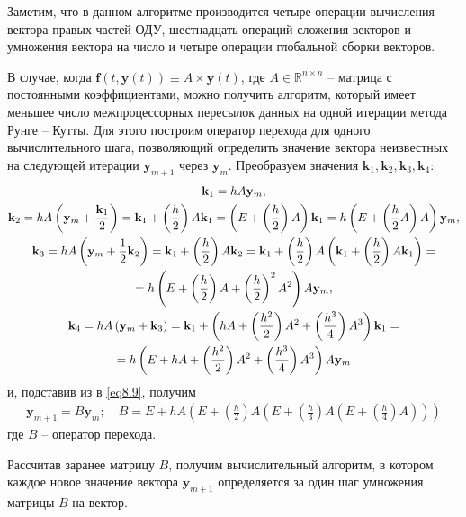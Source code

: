 \documentclass[14pt,final,titlepage,pscyr]{hedwork}
\renewcommand{\vec}[1]{\mathbf{#1}}
\begin{document}
	Заметим, что в данном алгоритме производится четыре операции вычисления вектора правых частей ОДУ, 
	шестнадцать операций сложения векторов и умножения вектора на число и четыре операции глобальной 
	сборки векторов. 

	В случае, когда \( \vec{f}(t, \vec{y}(t)) \equiv A \times \vec{y}(t) \), где 
	\( A \in \mathbb{R}^{n\times n} \) -- матрица с постоянными коэффициентами, можно получить алгоритм, 
	который имеет меньшее число межпроцессорных пересылок данных на одной итерации метода Рунге -- Кутты. 
	Для этого построим оператор перехода для одного вычислительного шага, позволяющий определить 
	значение вектора неизвестных на следующей итерации \( \vec{y}_{m+1} \) через \( \vec{y}_m \). 
	Преобразуем значения \( \vec{k}_1, \vec{k}_2, \vec{k}_3, \vec{k}_4 \):
	\begin{gather}
		\vec{k}_1 = hA\vec{y}_m, \notag \\
		\vec{k}_2 = hA\left(\vec{y}_m + \frac{\vec{k}_1}{2}\right) = 
			\vec{k}_1 + \left(\frac{h}{2}\right)A\vec{k}_1 = 
			\left( E + \left(\frac{h}{2}\right)A \right)\vec{k}_1 = 
			h\left( E + \left(\frac{h}{2}A \right)A \right) \vec{y}_m, \notag \\
		\vec{k}_3 = hA\left( \vec{y}_m + \frac{1}{2}\vec{k}_2 \right) = 
			\vec{k}_1 + \left( \frac{h}{2} \right)A\vec{k}_2 = 
			\vec{k}_1 + \left( \frac{h}{2} \right)A\left( \vec{k}_1 + 
			\left( \frac{h}{2} \right)A\vec{k}_1 \right) = \notag \\ =
			h\left( E + \left( \frac{h}{2} \right)A + \left( \frac{h}{2} \right)^2 A^2 \right)A\vec{y}_m, 
		\notag \\
		\vec{k}_4 = hA\left( \vec{y}_m + \vec{k}_3 \right) = 
			\vec{k}_1 + \left( hA + \left( \frac{h^2}{2} \right)A^2 + 
				\left( \frac{h^3}{4} \right)A^3 \right)\vec{k}_1 = \notag \\ = 
			h\left( E + hA + \left( \frac{h^2}{2} \right)A^2 + 
				\left( \frac{h^3}{4} \right)A^3 \right)A\vec{y}_m
		\notag
	\end{gather}
	и, подставив из в \eqref{eq8.9}, получим
	\begin{gather}
		\vec{y}_{m+1} = B\vec{y}_m; \quad
		B = E + hA\left( E + \left( \frac{h}{2} \right)A\left( 
			E + \left( \frac{h}{3} \right) A \left( E + \left( \frac{h}{4} \right)A \right) 
		\right) \right)
		\label{eq8.10}
	\end{gather}
	где \( B \) -- оператор перехода.

	Рассчитав заранее матрицу \( B \), получим вычислительный алгоритм, в котором каждое новое значение 
	вектора \( \vec{y}_{m+1} \) определяется за один шаг умножения матрицы \( B \) на вектор.
\end{document}
